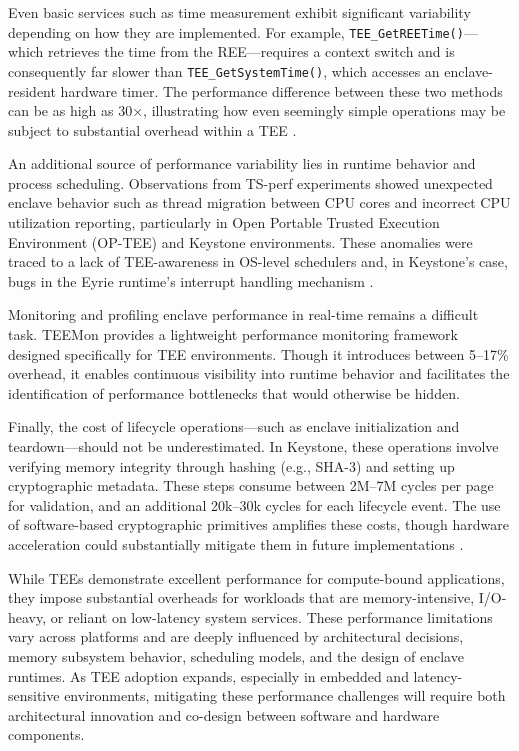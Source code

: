 Even basic services such as time measurement exhibit significant variability depending on how they are implemented. For example, \texttt{TEE\_GetREETime()}—which retrieves the time from the REE—requires a context switch and is consequently far slower than \texttt{TEE\_GetSystemTime()}, which accesses an enclave-resident hardware timer. The performance difference between these two methods can be as high as 30×, illustrating how even seemingly simple operations may be subject to substantial overhead within a TEE \cite{suzaki2021tsperf}.

An additional source of performance variability lies in runtime behavior and process scheduling. Observations from TS-perf experiments showed unexpected enclave behavior such as thread migration between CPU cores and incorrect CPU utilization reporting, particularly in Open Portable Trusted Execution Environment (OP-TEE) and Keystone environments. These anomalies were traced to a lack of TEE-awareness in OS-level schedulers and, in Keystone's case, bugs in the Eyrie runtime's interrupt handling mechanism \cite{suzaki2021tsperf}.

Monitoring and profiling enclave performance in real-time remains a difficult task. TEEMon \cite{krahn2020teemon} provides a lightweight performance monitoring framework designed specifically for TEE environments. Though it introduces between 5–17\% overhead, it enables continuous visibility into runtime behavior and facilitates the identification of performance bottlenecks that would otherwise be hidden.

Finally, the cost of lifecycle operations—such as enclave initialization and teardown—should not be underestimated. In Keystone, these operations involve verifying memory integrity through hashing (e.g., SHA-3) and setting up cryptographic metadata. These steps consume between 2M–7M cycles per page for validation, and an additional 20k–30k cycles for each lifecycle event. The use of software-based cryptographic primitives amplifies these costs, though hardware acceleration could substantially mitigate them in future implementations \cite{Lee2019}.

While TEEs demonstrate excellent performance for compute-bound applications, they impose substantial overheads for workloads that are memory-intensive, I/O-heavy, or reliant on low-latency system services. These performance limitations vary across platforms and are deeply influenced by architectural decisions, memory subsystem behavior, scheduling models, and the design of enclave runtimes. As TEE adoption expands, especially in embedded and latency-sensitive environments, mitigating these performance challenges will require both architectural innovation and co-design between software and hardware components.


